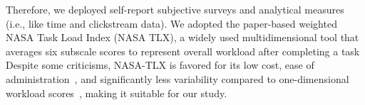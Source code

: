 Therefore, we deployed self-report subjective surveys and analytical measures (i.e., like time and clickstream data). We adopted the paper-based weighted NASA Task Load Index (NASA TLX), a widely used multidimensional tool that averages six subscale scores to represent overall workload after completing a task~\cite{hart1988development, hartNasaTaskLoadIndex2006, cain2007review} Despite some criticisms, NASA-TLX is favored for its low cost, ease of administration~\cite{gaoMentalWorkloadMeasurement2013}, and significantly less variability compared to one-dimensional workload scores~\cite{rubioEvaluationSubjectiveMental2004}, making it suitable for our study.





